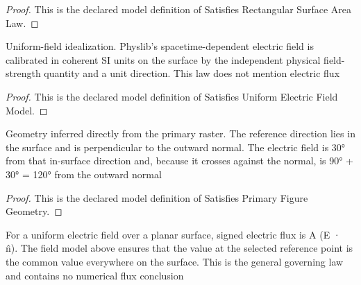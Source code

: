 \begin{proof}
  This is the declared model definition of Satisfies Rectangular Surface Area Law.
\end{proof}
\begin{definition}
  \label{def:physics:phyx-mini-0844:phyxminiproblems-problemphyxmini0844-satisfiesuniformelectricfieldmodel}
  Uniform-field idealization. Physlib's spacetime-dependent electric field is calibrated in coherent SI units on the surface by the independent physical field-strength quantity and a unit direction. This law does not mention electric flux
\end{definition}
\begin{proof}
  This is the declared model definition of Satisfies Uniform Electric Field Model.
\end{proof}
\begin{definition}
  \label{def:physics:phyx-mini-0844:phyxminiproblems-problemphyxmini0844-satisfiesprimaryfiguregeometry}
  Geometry inferred directly from the primary raster. The reference direction lies in the surface and is perpendicular to the outward normal. The electric field is 30° from that in-surface direction and, because it crosses against the normal, is 90° + 30° = 120° from the outward normal
\end{definition}
\begin{proof}
  This is the declared model definition of Satisfies Primary Figure Geometry.
\end{proof}
\begin{definition}
  \label{def:physics:phyx-mini-0844:phyxminiproblems-problemphyxmini0844-satisfiesuniformplanarelectricfluxlaw}
  For a uniform electric field over a planar surface, signed electric flux is A (E · n̂). The field model above ensures that the value at the selected reference point is the common value everywhere on the surface. This is the general governing law and contains no numerical flux conclusion
\end{definition}

